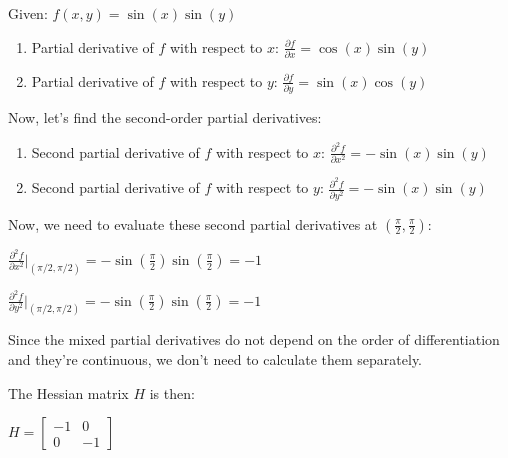 \documentclass[11pt]{article}
\makeatletter
\newcommand{\boxspacing}{\kern\kvtcb@left@rule\kern\kvtcb@boxsep}
\newcommand{\prompt}[4]{
        {\ttfamily\llap{{\color{#2}[#3]:\hspace{3pt}#4}}\vspace{-\baselineskip}}
    }
\makeatother
\begin{document}
Given: $ f(x, y) = \sin(x) \sin(y) $

\begin{enumerate}
\def\labelenumi{\arabic{enumi}.}
\item
  Partial derivative of $ f $ with respect to $ x $: $
  \frac{\partial f}{\partial x} = \cos(x) \sin(y) $
\item
  Partial derivative of $ f $ with respect to $ y $: $
  \frac{\partial f}{\partial y} = \sin(x) \cos(y) $
\end{enumerate}

Now, let's find the second-order partial derivatives:

\begin{enumerate}
\def\labelenumi{\arabic{enumi}.}
\setcounter{enumi}{2}
\item
  Second partial derivative of $ f $ with respect to $ x $: $
  \frac{\partial^2 f}{\partial x^2} = -\sin(x) \sin(y) $
\item
  Second partial derivative of $ f $ with respect to $ y $: $
  \frac{\partial^2 f}{\partial y^2} = -\sin(x) \sin(y) $
\end{enumerate}

Now, we need to evaluate these second partial derivatives at $
\left(\frac{\pi}{2}, \frac{\pi}{2}\right) $:

$ \frac{\partial^2 f}{\partial x^2} \bigg|_{(\pi/2, \pi/2)} = -\sin\left(\frac{\pi}{2}\right) \sin\left(\frac{\pi}{2}\right) = -1 $

$ \frac{\partial^2 f}{\partial y^2} \bigg|_{(\pi/2, \pi/2)} = -\sin\left(\frac{\pi}{2}\right) \sin\left(\frac{\pi}{2}\right) = -1 $

Since the mixed partial derivatives do not depend on the order of
differentiation and they're continuous, we don't need to calculate them
separately.

The Hessian matrix $ H $ is then:

$ H =\begin{bmatrix} -1 & 0 \\ 0 & -1 \end{bmatrix}$

    \begin{tcolorbox}[breakable, size=fbox, boxrule=1pt, pad at break*=1mm,colback=cellbackground, colframe=cellborder]
\prompt{In}{incolor}{ }{\boxspacing}
\begin{Verbatim}[commandchars=\\\{\}]

\end{Verbatim}
\end{tcolorbox}

    


    
    
    
\end{document}
